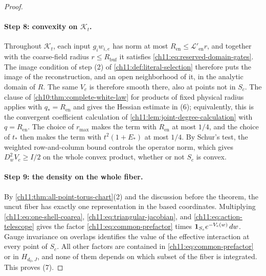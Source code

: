 \begin{proof}
\paragraph{Step 8: convexity on $\mathcal K_t$.}
Throughout $\mathcal K_t$, each input $g_iw_{i,e}$ has norm at most $R_{\mathrm{en}}\le\mathscr L'_{\mathrm{en}}r$, and together with the coarse-field radius $r\le R_{\mathrm{buf}}$ it satisfies \eqref{ch11:eq:reserved-domain-gates}. The image condition of step (2) of \cref{ch11:def:literal-selection} therefore puts the image of the reconstruction, and an open neighborhood of it, in the analytic domain of $R$. The same $V_c$ is therefore smooth there, also at points not in $S_c$. The clause of \cref{ch10:thm:complete-white-law} for products of fixed physical radius applies with $q_*=R_{\mathrm{en}}$ and gives the Hessian estimate in (6); equivalently, this is the convergent coefficient calculation of \cref{ch11:lem:joint-degree-calculation} with $q=R_{\mathrm{en}}$. The choice of $r_{\max}$ makes the term with $R_{\mathrm{en}}$ at most $1/4$, and the choice of $t_*$ then makes the term with $t^2(1+E_*)$ at most $1/4$. By Schur's test, the weighted row-and-column bound controls the operator norm, which gives $D_w^2V_c\ge I/2$ on the whole convex product, whether or not $S_c$ is convex.

\paragraph{Step 9: the density on the whole fiber.}
By \cref{ch11:thm:all-point-torus-chart}(2) and the discussion before the theorem, the uncut fiber has exactly one representation in the based coordinates. Multiplying \eqref{ch11:eq:one-shell-coarea}, \eqref{ch11:eq:triangular-jacobian}, and \eqref{ch11:eq:action-telescope} gives the factor \eqref{ch11:eq:common-prefactor} times $\mathbf 1_{S_c}e^{-V_c(w)}\,dw$. Gauge invariance on overlaps identifies the value of the effective interaction at every point of $S_c$. All other factors are contained in \eqref{ch11:eq:common-prefactor} or in $H_{d_0,J}$, and none of them depends on which subset of the fiber is integrated. This proves (7).


\end{proof}
